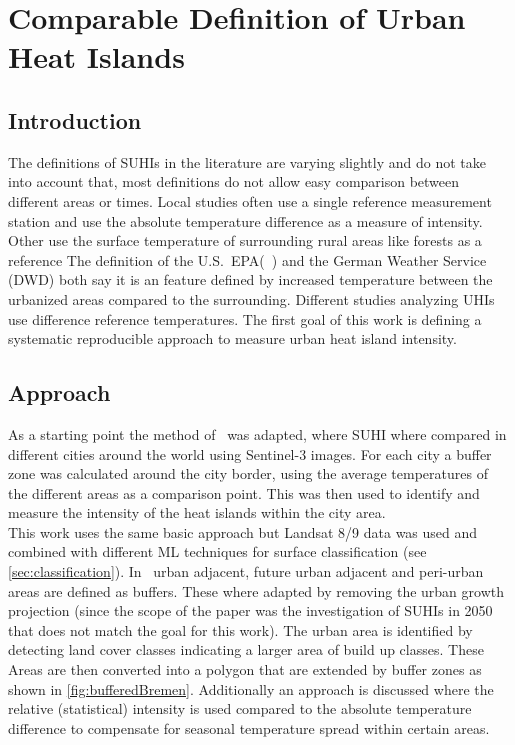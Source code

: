 \documentclass[12pt,a4paper, english,twoside]{article}
\begin{document}
\newpage
\section{Comparable Definition of Urban Heat Islands}\label{sec:definition}
    \subsection{Introduction}
      The definitions of \glspl{SUHI} in the literature are varying slightly and do not take into account that, most definitions do not allow easy comparison between different areas or times.
      Local studies often use a single reference measurement station and use the absolute temperature difference as a measure of intensity.%
      Other use the surface temperature of surrounding rural areas like forests as a reference%
      The definition of the U.S.~EPA(~\cite{EPA2008}) and the German Weather Service (\gls{DWD}) both say it is an feature defined by increased temperature between the urbanized areas compared to the surrounding. %
      Different studies analyzing \glspl{UHI} use difference reference temperatures.
      The first goal of this work is defining a systematic reproducible approach to measure urban heat island intensity.
%
    \subsection{Approach}
    As a starting point the method of~\cite{Sobrino2020} was adapted, where \gls{SUHI} where compared in different cities around the world using Sentinel-3 images. 
    For each city a buffer zone was calculated around the city border, using the average temperatures of the different areas as a comparison point.
    This was then used to identify and measure the intensity of the heat islands within the city area.\\ 
    This work uses the same basic approach but Landsat 8/9 data was used and combined with different \gls{ML} techniques for surface classification (see \cref{sec:classification}). 
    In~\cite{Sobrino2020} urban adjacent, future urban adjacent and peri-urban areas are defined as buffers.
    These where adapted by removing the urban growth projection (since the scope of the paper was the investigation of \glspl{SUHI} in 2050 that does not match the goal for this work).
    The urban area is identified by detecting land cover classes indicating a larger area of build up classes. 
    These Areas are then converted into a polygon that are extended by buffer zones as shown in \cref{fig:bufferedBremen}.
    Additionally an approach is discussed where the relative (statistical) intensity is used compared to the absolute temperature difference to compensate for seasonal temperature spread within certain areas.
\end{document}
